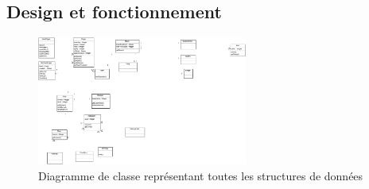 \documentclass[a4paper]{article}
\begin{document}
\subsection{Design et fonctionnement}
\begin{figure}[h]
   \caption{\label{3} Diagramme de classe représentant toutes les structures de données}
   \begin{center}
   \includegraphics[height=120pt]{uml/classDiagram.eps}
   \end{center}
\end{figure}

\printindex
\tableofcontents
\listoffigures
\end{document}
